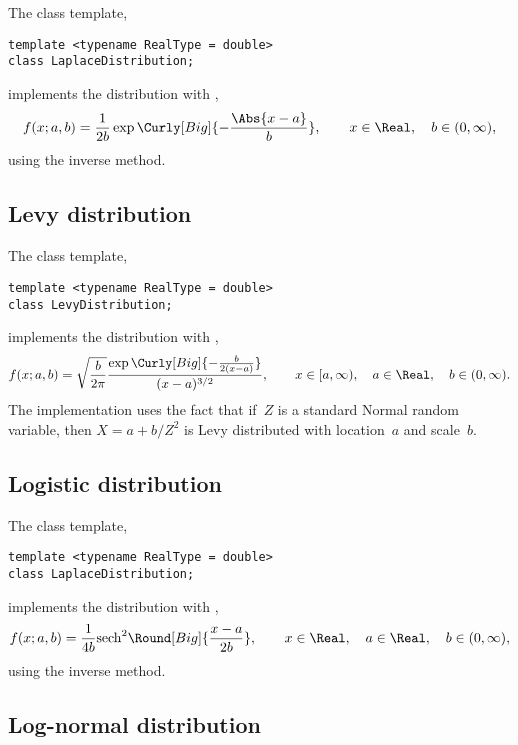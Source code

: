 The class template,
\begin{verbatim}
template <typename RealType = double>
class LaplaceDistribution;
\end{verbatim}
implements the distribution with \pdf,
\begin{equation*}
  f(x;a,b) = \frac{1}{2b}\exp\Curly[Big]{-\frac{\Abs{x - a}}{b}},\qquad
  x \in \Real,\quad b \in (0, \infty),
\end{equation*}
using the inverse method.

\subsection{Levy distribution}
\label{sub:Levy distribution}

The class template,
\begin{verbatim}
template <typename RealType = double>
class LevyDistribution;
\end{verbatim}
implements the distribution with \pdf,
\begin{equation*}
  f(x;a,b) =
  \sqrt{\frac{b}{2\pi}}
  \frac{\exp\Curly[Big]{-\frac{b}{2(x - a)}}}{(x - a)^{3/2}},\qquad
  x \in [a, \infty),\quad a \in \Real,\quad b \in (0, \infty).
\end{equation*}
The implementation uses the fact that if~$Z$ is a standard Normal random
variable, then $X = a + b / Z^2$ is Levy distributed with location~$a$ and
scale~$b$.

\subsection{Logistic distribution}
\label{sub:Logistic distribution}

The class template,
\begin{verbatim}
template <typename RealType = double>
class LaplaceDistribution;
\end{verbatim}
implements the distribution with \pdf,
\begin{equation*}
  f(x;a,b) = \frac{1}{4b}\mathrm{sech}^2\Round[Big]{\frac{x - a}{2b}},\qquad
  x \in \Real,\quad a \in \Real,\quad b \in (0, \infty),
\end{equation*}
using the inverse method.

\subsection{Log-normal distribution}
\label{sub:Log-normal distribution}

